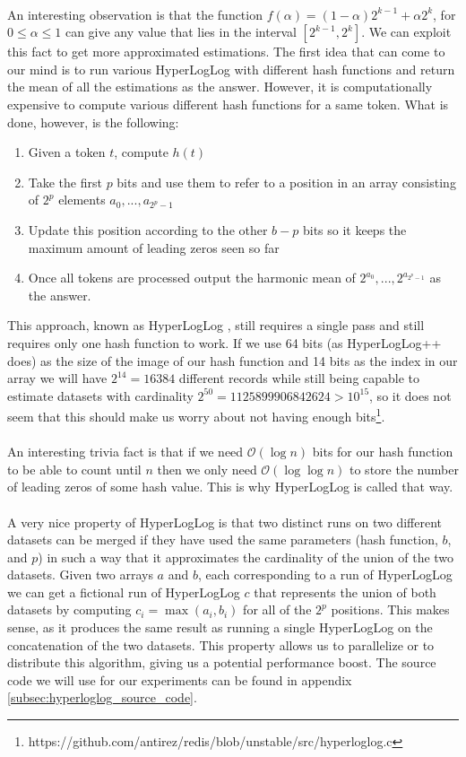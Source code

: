 \\
An interesting observation is that the function $f(\alpha) = (1 - \alpha)2^{k - 1} + \alpha2^{k}$, for $0 \leq \alpha \leq 1$ can give any value that lies in the interval $[2^{k - 1}, 2^{k}]$. We can exploit this fact to get more approximated estimations. The first idea that can come to our mind is to run various HyperLogLog with different hash functions and return the mean of all the estimations as the answer. However, it is computationally expensive to compute various different hash functions for a same token. What is done, however, is the following: 
\begin{enumerate}
\item Given a token $t$, compute $h(t)$
\item Take the first $p$ bits and use them to refer to a position in an array consisting of $2^p$ elements $a_{0}, ..., a_{2^p - 1}$
\item Update this position according to the other $b - p$ bits so it keeps the maximum amount of leading zeros seen so far
\item Once all tokens are processed output the harmonic mean of $2^{a_{0}}, ..., 2^{a_{2^p - 1}}$ as the answer.
\end{enumerate}
This approach, known as HyperLogLog \cite{Flajolet07hyperloglog:the}, still requires a single pass and still requires only one hash function to work. If we use 64 bits (as HyperLogLog++ \cite{40671} does) as the size of the image of our hash function and 14 bits as the index in our array we will have $2^{14} = 16384$ different records while still being capable to estimate datasets with cardinality $2^{50} = 1125899906842624 > 10^{15}$, so it does not seem that this should make us worry about not having enough bits\footnote{https://github.com/antirez/redis/blob/unstable/src/hyperloglog.c}.\\
\\
An interesting trivia fact is that if we need $\mathcal{O}(\log n)$ bits for our hash function to be able to count until $n$ then we only need $\mathcal{O}(\log \log n)$ to store the number of leading zeros of some hash value. This is why HyperLogLog is called that way.\\
\\
A very nice property of HyperLogLog is that two distinct runs on two different datasets can be merged if they have used the same parameters (hash function, $b$, and $p$) in such a way that it approximates the cardinality of the union of the two datasets. Given two arrays $a$ and $b$, each corresponding to a run of HyperLogLog we can get a fictional run of HyperLogLog $c$ that represents the union of both datasets by computing $c_{i} =\max(a_{i}, b_{i})$ for all of the $2^{p}$ positions. This makes sense, as it produces the same result as running a single HyperLogLog on the concatenation of the two datasets. This property allows us to parallelize or to distribute this algorithm, giving us a potential performance boost. The source code we will use for our experiments can be found in appendix \ref{subsec:hyperloglog_source_code}.\\
